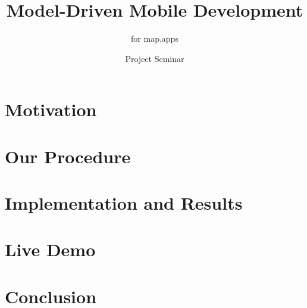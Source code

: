 \documentclass{beamer}
\author{Project Seminar \MD}
\title{Model-Driven Mobile Development}
\subtitle{\MD for map.apps}
\begin{document}
	\begin{frame}[plain]
	  \maketitle
	\end{frame}

    
    
    \section[Motivation]{Motivation}
    
    
    \section[Procedure]{Our Procedure}
    
    
    \section[Results]{Implementation and Results}
    
    
    \section{Live Demo}
       
    
    \section{Conclusion}
    
\end{document}
